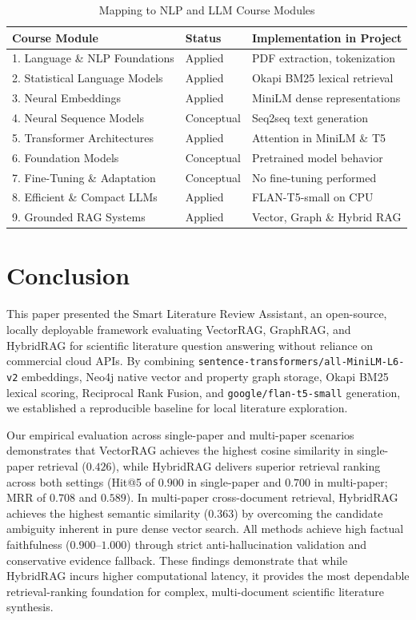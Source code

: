 \documentclass[conference]{IEEEtran}
\begin{document}
\begin{table}[t]
\caption{Mapping to NLP and LLM Course Modules}
\label{tab:modules}
\centering
\footnotesize
\begin{tabular}{p{3.8cm}p{1.1cm}p{2.2cm}}
\toprule
\textbf{Course Module} & \textbf{Status} & \textbf{Implementation in Project} \\
\midrule
1. Language \& NLP Foundations & Applied & PDF extraction, tokenization \\
2. Statistical Language Models & Applied & Okapi BM25 lexical retrieval \\
3. Neural Embeddings & Applied & MiniLM dense representations \\
4. Neural Sequence Models & Conceptual & Seq2seq text generation \\
5. Transformer Architectures & Applied & Attention in MiniLM \& T5 \\
6. Foundation Models & Conceptual & Pretrained model behavior \\
7. Fine-Tuning \& Adaptation & Conceptual & No fine-tuning performed \\
8. Efficient \& Compact LLMs & Applied & FLAN-T5-small on CPU \\
9. Grounded RAG Systems & Applied & Vector, Graph \& Hybrid RAG \\
\bottomrule
\end{tabular}
\end{table}


\section{Conclusion}

This paper presented the Smart Literature Review Assistant, an open-source, locally deployable framework evaluating VectorRAG, GraphRAG, and HybridRAG for scientific literature question answering without reliance on commercial cloud APIs. By combining \texttt{sentence-transformers/all-MiniLM-L6-v2} embeddings, Neo4j native vector and property graph storage, Okapi BM25 lexical scoring, Reciprocal Rank Fusion, and \texttt{google/flan-t5-small} generation, we established a reproducible baseline for local literature exploration.

Our empirical evaluation across single-paper and multi-paper scenarios demonstrates that VectorRAG achieves the highest cosine similarity in single-paper retrieval ($0.426$), while HybridRAG delivers superior retrieval ranking across both settings (Hit@5 of $0.900$ in single-paper and $0.700$ in multi-paper; MRR of $0.708$ and $0.589$). In multi-paper cross-document retrieval, HybridRAG achieves the highest semantic similarity ($0.363$) by overcoming the candidate ambiguity inherent in pure dense vector search. All methods achieve high factual faithfulness ($0.900$--$1.000$) through strict anti-hallucination validation and conservative evidence fallback. These findings demonstrate that while HybridRAG incurs higher computational latency, it provides the most dependable retrieval-ranking foundation for complex, multi-document scientific literature synthesis.




\end{document}
